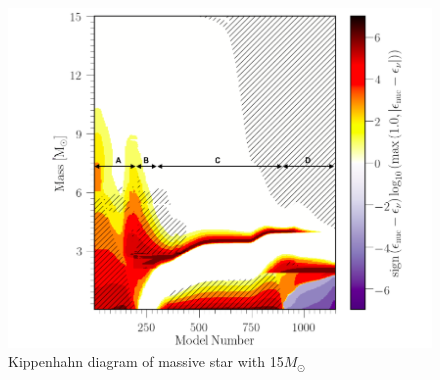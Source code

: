 \documentclass{article}
\begin{document}
\begin{figure}[H]
    \centering
    \includegraphics[width=14cm]{plots/Kipp15m.png}
    \caption{Kippenhahn diagram of  massive star with 15$M_{\odot}$}
    \label{fig:KH1}
\end{figure}
\end{document}
